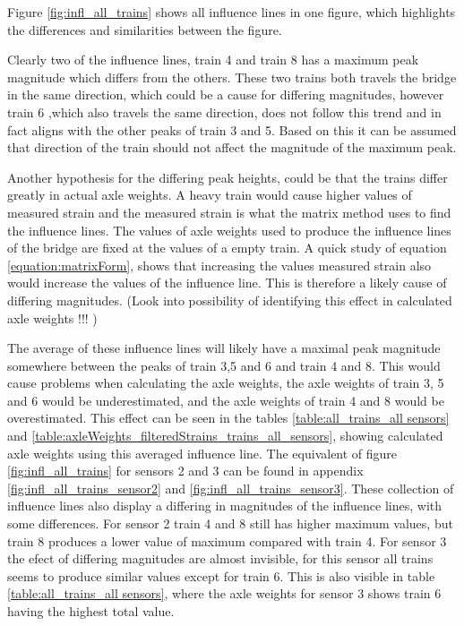 Figure \ref{fig:infl_all_trains} shows all influence lines in one figure, which highlights the differences and similarities between the figure.

Clearly two of the influence lines, train 4 and train 8 has a maximum peak magnitude which differs from the others. These two trains both travels the bridge in the same direction, which could be a cause for differing magnitudes, however train 6 ,which also travels the same direction, does not follow this trend and in fact aligns with the other peaks of train 3 and 5. Based on this it can be assumed that direction of the train should not affect the magnitude of the maximum peak.

Another hypothesis for the differing peak heights, could be that the trains differ greatly in actual axle weights. A heavy train would cause higher values of measured strain and the measured strain is what the matrix method uses to find the influence lines. The values of axle weights used to produce the influence lines of the bridge are fixed at the values of a empty train. A quick study of equation \ref{equation:matrixForm}, shows that increasing the values measured strain also would increase the values of the influence line. This is therefore a likely cause of differing magnitudes. (Look into possibility of identifying this effect in calculated axle weights !!! )

The average of these influence lines will likely have a maximal peak magnitude somewhere between the peaks of train 3,5 and 6 and train 4 and 8. This would cause problems when calculating the axle weights, the axle weights of train 3, 5 and 6 would be underestimated, and the axle weights of train 4 and 8 would be overestimated. This effect can be seen in the tables \ref{table:all_trains_all sensors} and \ref{table:axleWeights_filteredStrains_trains_all_sensors}, showing calculated axle weights using this averaged influence line. The equivalent of figure \ref{fig:infl_all_trains} for sensors 2 and 3 can be found in appendix \ref{fig:infl_all_trains_sensor2} and \ref{fig:infl_all_trains_sensor3}. These collection of influence lines also display a differing in magnitudes of the influence lines, with some differences. For sensor 2 train 4 and 8 still has higher maximum values, but train 8 produces a lower value of maximum compared with train 4. For sensor 3 the efect of differing magnitudes are almost invisible, for this sensor all trains seems to produce similar values except for train 6. This is also visible in table \ref{table:all_trains_all sensors}, where the axle weights for sensor 3 shows train 6 having the highest total value.

